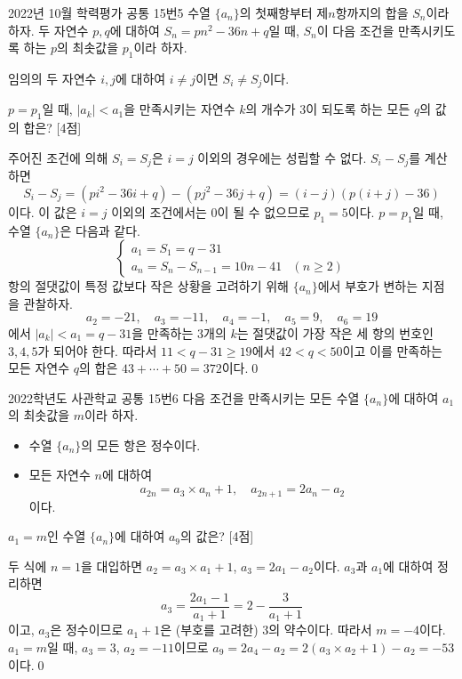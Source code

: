 \documentclass{article}
\begin{document}
\newpage
\begin{prob}{2022년 10월 학력평가 공통 15번}{5}
	수열 $\{a_n\}$의 첫째항부터 제$n$항까지의 합을 $S_n$이라 하자. 두 자연수 $p,q$에 대하여 $S_n=pn^2-36n+q$일 때, $S_n$이 다음 조건을 만족시키도록 하는 $p$의 최솟값을 $p_1$이라 하자.
	\begin{hint}
		임의의 두 자연수 $i,j$에 대하여 $i\ne j$이면 $S_i\ne S_j$이다.
	\end{hint}
	$p=p_1$일 때, $\vert a_k\vert<a_1$을 만족시키는 자연수 $k$의 개수가 $3$이 되도록 하는 모든 $q$의 값의 합은? [4점]
\end{prob}

\begin{sol}
	주어진 조건에 의해 $S_i=S_j$은 $i=j$ 이외의 경우에는 성립할 수 없다. $S_i-S_j$를 계산하면
	\[
		S_i-S_j=(pi^2-36i+q)-(pj^2-36j+q)=(i-j)(p(i+j)-36)
	\]
	이다. 이 값은 $i=j$ 이외의 조건에서는 $0$이 될 수 없으므로 $p_1=5$이다. $p=p_1$일 때, 수열 $\{a_n\}$은 다음과 같다.
	\[
		\begin{cases}
			a_1=S_1=q-31 \\
			a_n=S_n-S_{n-1}=10n-41 & (n\geq2)
		\end{cases}
	\]
	항의 절댓값이 특정 값보다 작은 상황을 고려하기 위해 $\{a_n\}$에서 부호가 변하는 지점을 관찰하자.
	\[
		a_2=-21,\quad a_3=-11,\quad a_4=-1,\quad a_5=9,\quad a_6=19
	\]
	에서 $\vert a_k\vert<a_1=q-31$을 만족하는 $3$개의 $k$는 절댓값이 가장 작은 세 항의 번호인 $3,4,5$가 되어야 한다. 따라서 $11<q-31\geq19$에서 $42<q<50$이고 이를 만족하는 모든 자연수 $q$의 합은 $43+\cdots+50=372$이다.\qed
\end{sol}

\newpage
\begin{prob}{2022학년도 사관학교 공통 15번}{6}
	다음 조건을 만족시키는 모든 수열 $\{a_n\}$에 대하여 $a_1$의 최솟값을 $m$이라 하자.
	\begin{hint}
		\begin{itemize}
			\item[(가)] 수열 $\{a_n\}$의 모든 항은 정수이다.
			\item[(나)] 모든 자연수 $n$에 대하여
				\[
					a_{2n}=a_3\times a_n+1,\quad a_{2n+1}=2a_n-a_2
				\]
				이다.
		\end{itemize}
	\end{hint}
	$a_1=m$인 수열 $\{a_n\}$에 대하여 $a_9$의 값은? [4점]
\end{prob}

\begin{sol}
	두 식에 $n=1$을 대입하면 $a_2=a_3\times a_1+1$, $a_3=2a_1-a_2$이다. $a_3$과 $a_1$에 대하여 정리하면
	\[
		a_3=\frac{2a_1-1}{a_1+1}=2-\frac{3}{a_1+1}
	\]
	이고, $a_3$은 정수이므로 $a_1+1$은 (부호를 고려한) $3$의 약수이다. 따라서 $m=-4$이다. $a_1=m$일 때, $a_3=3$, $a_2=-11$이므로 $a_9=2a_4-a_2=2(a_3\times a_2+1)-a_2=-53$이다.\qed
\end{sol}
\end{document}
